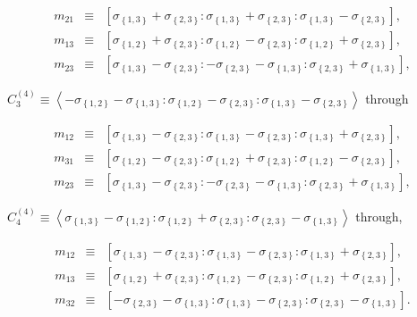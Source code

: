 \documentclass[11pt]{article}
\begin{document}
\begin{eqnarray*}
m_{21} &\equiv &\left[ \sigma _{\left\{ 1,3\right\} }+\sigma _{\left\{
2,3\right\} }:\sigma _{\left\{ 1,3\right\} }+\sigma _{\left\{ 2,3\right\}
}:\sigma _{\left\{ 1,3\right\} }-\sigma _{\left\{ 2,3\right\} }\right] , \\
m_{13} &\equiv &\left[ \sigma _{\left\{ 1,2\right\} }+\sigma _{\left\{
2,3\right\} }:\sigma _{\left\{ 1,2\right\} }-\sigma _{\left\{ 2,3\right\}
}:\sigma _{\left\{ 1,2\right\} }+\sigma _{\left\{ 2,3\right\} }\right] , \\
m_{23} &\equiv &\left[ \sigma _{\left\{ 1,3\right\} }-\sigma _{\left\{
2,3\right\} }:-\sigma _{\left\{ 2,3\right\} }-\sigma _{\left\{ 1,3\right\}
}:\sigma _{\left\{ 2,3\right\} }+\sigma _{\left\{ 1,3\right\} }\right] ,
\end{eqnarray*}

$C_{3}^{\left( 4\right) }\equiv \left\langle -\sigma _{\left\{ 1,2\right\}
}-\sigma _{\left\{ 1,3\right\} }:\sigma _{\left\{ 1,2\right\} }-\sigma
_{\left\{ 2,3\right\} }:\sigma _{\left\{ 1,3\right\} }-\sigma _{\left\{
2,3\right\} }\right\rangle $ through

\begin{eqnarray*}
m_{12} &\equiv &\left[ \sigma _{\left\{ 1,3\right\} }-\sigma _{\left\{
2,3\right\} }:\sigma _{\left\{ 1,3\right\} }-\sigma _{\left\{ 2,3\right\}
}:\sigma _{\left\{ 1,3\right\} }+\sigma _{\left\{ 2,3\right\} }\right] , \\
m_{31} &\equiv &\left[ \sigma _{\left\{ 1,2\right\} }-\sigma _{\left\{
2,3\right\} }:\sigma _{\left\{ 1,2\right\} }+\sigma _{\left\{ 2,3\right\}
}:\sigma _{\left\{ 1,2\right\} }-\sigma _{\left\{ 2,3\right\} }\right] , \\
m_{23} &\equiv &\left[ \sigma _{\left\{ 1,3\right\} }-\sigma _{\left\{
2,3\right\} }:-\sigma _{\left\{ 2,3\right\} }-\sigma _{\left\{ 1,3\right\}
}:\sigma _{\left\{ 2,3\right\} }+\sigma _{\left\{ 1,3\right\} }\right] ,
\end{eqnarray*}

$C_{4}^{\left( 4\right) }\equiv \left\langle \sigma _{\left\{ 1,3\right\}
}-\sigma _{\left\{ 1,2\right\} }:\sigma _{\left\{ 1,2\right\} }+\sigma
_{\left\{ 2,3\right\} }:\sigma _{\left\{ 2,3\right\} }-\sigma _{\left\{
1,3\right\} }\right\rangle $ through,

\begin{eqnarray*}
m_{12} &\equiv &\left[ \sigma _{\left\{ 1,3\right\} }-\sigma _{\left\{
2,3\right\} }:\sigma _{\left\{ 1,3\right\} }-\sigma _{\left\{ 2,3\right\}
}:\sigma _{\left\{ 1,3\right\} }+\sigma _{\left\{ 2,3\right\} }\right] , \\
m_{13} &\equiv &\left[ \sigma _{\left\{ 1,2\right\} }+\sigma _{\left\{
2,3\right\} }:\sigma _{\left\{ 1,2\right\} }-\sigma _{\left\{ 2,3\right\}
}:\sigma _{\left\{ 1,2\right\} }+\sigma _{\left\{ 2,3\right\} }\right] , \\
m_{32} &\equiv &\left[ -\sigma _{\left\{ 2,3\right\} }-\sigma _{\left\{
1,3\right\} }:\sigma _{\left\{ 1,3\right\} }-\sigma _{\left\{ 2,3\right\}
}:\sigma _{\left\{ 2,3\right\} }-\sigma _{\left\{ 1,3\right\} }\right] .
\end{eqnarray*}
\end{document}
